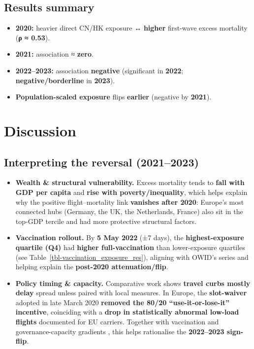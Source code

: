\documentclass[
  authoryear,
  preprint,
  3p,
  onecolumn]{elsarticle}
\providecommand{\tightlist}{%
  \setlength{\itemsep}{0pt}\setlength{\parskip}{0pt}}\usepackage{longtable,booktabs,array}
\begin{document}
\subsection{Results summary}\label{results-summary}

\begin{itemize}
\tightlist
\item
  \textbf{2020:} heavier direct CN/HK exposure ↔ \textbf{higher}
  first-wave excess mortality (\textbf{ρ ≈ 0.53}).
\item
  \textbf{2021:} association ≈ \textbf{zero}.
\item
  \textbf{2022--2023:} association \textbf{negative} (significant in
  \textbf{2022}; \textbf{negative/borderline} in \textbf{2023}).
\item
  \textbf{Population-scaled exposure} flips \textbf{earlier} (negative
  by \textbf{2021}).
\end{itemize}

\section{Discussion}\label{discussion}

\subsection{Interpreting the reversal
(2021--2023)}\label{interpreting-the-reversal-20212023}

\begin{itemize}
\item
  \textbf{Wealth \& structural vulnerability.} Excess mortality tends to
  \textbf{fall with GDP per capita} and \textbf{rise with
  poverty/inequality}, which helps explain why the positive
  flight--mortality link \textbf{vanishes after 2020}: Europe's most
  connected hubs (Germany, the UK, the Netherlands, France) also sit in
  the top-GDP tercile and had more protective structural factors.
  \citep{ioannidis2023}
\item
  \textbf{Vaccination rollout.} By \textbf{5 May 2022} (±7 days), the
  \textbf{highest-exposure quartile (Q4)} had \textbf{higher
  full-vaccination} than lower-exposure quartiles (see
  Table~\ref{tbl-vaccination_exposure_res}), aligning with OWID's series
  and helping explain the \textbf{post-2020 attenuation/flip}.
  \citep{mathieu2021owidvaccinations}
\item
  \textbf{Policy timing \& capacity.} Comparative work shows
  \textbf{travel curbs mostly delay} spread unless paired with local
  measures. \citep{chinazzi2020} In Europe, the \textbf{slot-waiver}
  adopted in late March 2020 \textbf{removed the 80/20
  ``use-it-or-lose-it'' incentive}, coinciding with a \textbf{drop in
  statistically abnormal low-load flights} documented for EU carriers.
  \citep{sun2022_a, sun2022_b} Together with vaccination and
  governance-capacity gradients \citep{rahmanian2024}, this helps
  rationalise the \textbf{2022--2023 sign-flip}.
\end{itemize}
\end{document}
